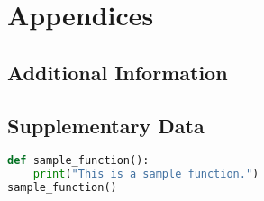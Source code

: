 \chapter*{Appendices}
\appendix
\renewcommand{\thesection}{\Alph{section}}
\setcounter{section}{0}
\section{Additional Information}
\lipsum[1]
\section{Supplementary Data}
\lipsum[2]
\begin{lstlisting}[language=Python, caption={Sample Python Code}, label={lst:sample-python}]
def sample_function():
    print("This is a sample function.")
sample_function()
\end{lstlisting}